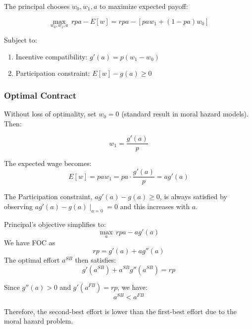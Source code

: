 \documentclass[11pt]{article}
\begin{document}
The principal chooses $w_0, w_1, a$ to maximize expected payoff:

\[
\max_{w_0, w_1, a} \, r p a - E[w] = r p a - [p a w_1 + (1 - p a) w_0]
\]

Subject to:
\begin{enumerate}
\item Incentive compatibility: $g'(a) = p (w_1 - w_0)$
\item Participation constraint: $E[w] - g(a) \geq 0$
\end{enumerate}

\subsubsection{Optimal Contract}

Without loss of optimality, set $w_0 = 0$ (standard result in moral hazard models). Then:

\[
w_1 = \frac{g'(a)}{p}
\]

The expected wage becomes:
\[
E[w] = p a w_1 = p a \cdot \frac{g'(a)}{p} = a g'(a)
\]

The Participation constraint, $a g'(a) - g(a) \geq 0$, is always satisfied by observing $a g'(a) - g(a) \mid_{a=0} = 0$ and this increases with $a$.

Principal's objective simplifies to:
\[
\max_a \, r p a - a g'(a)
\]
We have FOC as
\[
r p = g'(a) + a g''(a)
\]
The optimal effort $a^{SB}$ then satisfies:
\[
g'(a^{SB}) + a^{SB} g''(a^{SB}) = r p
\]


Since $g''(a) > 0$ and $g'(a^{FB}) = r p$, we have:
\[
a^{SB} < a^{FB}\]

Therefore, the second-best effort is lower than the first-best effort due to the moral hazard problem.
\end{document}
